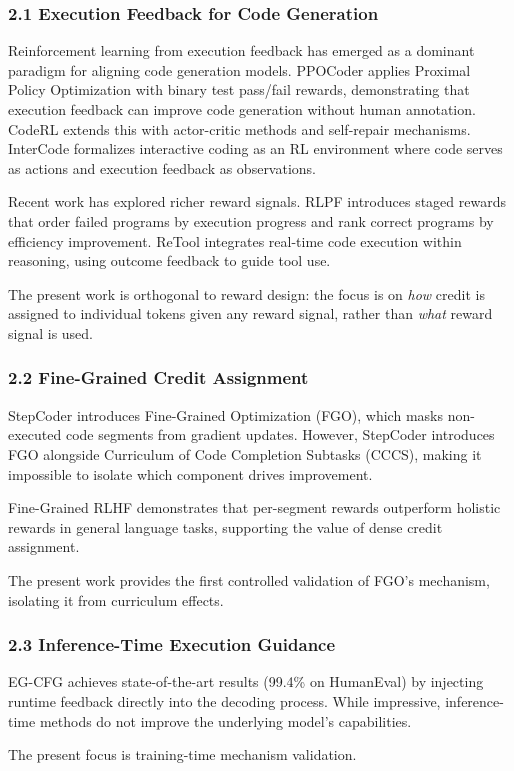 
\subsubsection{2.1 Execution Feedback for Code Generation}

Reinforcement learning from execution feedback has emerged as a dominant paradigm for aligning code generation models. PPOCoder applies Proximal Policy Optimization with binary test pass/fail rewards, demonstrating that execution feedback can improve code generation without human annotation. CodeRL extends this with actor-critic methods and self-repair mechanisms. InterCode formalizes interactive coding as an RL environment where code serves as actions and execution feedback as observations.

Recent work has explored richer reward signals. RLPF introduces staged rewards that order failed programs by execution progress and rank correct programs by efficiency improvement. ReTool integrates real-time code execution within reasoning, using outcome feedback to guide tool use.

The present work is orthogonal to reward design: the focus is on \textit{how} credit is assigned to individual tokens given any reward signal, rather than \textit{what} reward signal is used.

\subsubsection{2.2 Fine-Grained Credit Assignment}

StepCoder introduces Fine-Grained Optimization (FGO), which masks non-executed code segments from gradient updates. However, StepCoder introduces FGO alongside Curriculum of Code Completion Subtasks (CCCS), making it impossible to isolate which component drives improvement.

Fine-Grained RLHF demonstrates that per-segment rewards outperform holistic rewards in general language tasks, supporting the value of dense credit assignment.

The present work provides the first controlled validation of FGO's mechanism, isolating it from curriculum effects.

\subsubsection{2.3 Inference-Time Execution Guidance}

EG-CFG achieves state-of-the-art results (99.4\% on HumanEval) by injecting runtime feedback directly into the decoding process. While impressive, inference-time methods do not improve the underlying model's capabilities.

The present focus is training-time mechanism validation.
